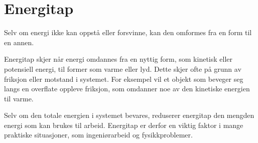 \medskip




\newpage

\section{Energitap}
Selv om energi ikke kan oppstå eller forsvinne, kan den omformes fra en form til en annen. 

Energitap skjer når energi omdannes fra en nyttig form, som kinetisk eller potensiell energi, til former som varme eller lyd. Dette skjer ofte på grunn av friksjon eller motstand i systemet. For eksempel vil et objekt som beveger seg langs en overflate oppleve friksjon, som omdanner noe av den kinetiske energien til varme. 

Selv om den totale energien i systemet bevares, reduserer energitap den mengden energi som kan brukes til arbeid. Energitap er derfor en viktig faktor i mange praktiske situasjoner, som ingeniørarbeid og fysikkproblemer.


